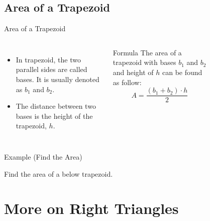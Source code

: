 \subsection{Area of a Trapezoid}
\begin{frame}{Area of a Trapezoid}
    \begin{columns}
        \begin{itemize}
            \item In trapezoid, the two parallel sides are called bases. It is usually denoted as $b_1$ and $b_2$.
            \item The distance between two bases is the height of the trapezoid, $h$.
        \end{itemize}
        \begin{block}{Formula}
            The area of a trapezoid with bases $b_1$ and $b_2$ and height of $h$ can be found as follow:
            \[ A = \frac{(b_1+b_2)\cdot h}{2}\]
        \end{block}
        \begin{figure}[H]
            \centering
            
        \end{figure}
    \end{columns}
\end{frame}
\begin{frame}[t]{Example (Find the Area)}
    \begin{example}
        Find the area of a below trapezoid.
        \begin{figure}[H]
            \centering
            
        \end{figure}
    \end{example}
\end{frame}
\section{More on Right Triangles}
